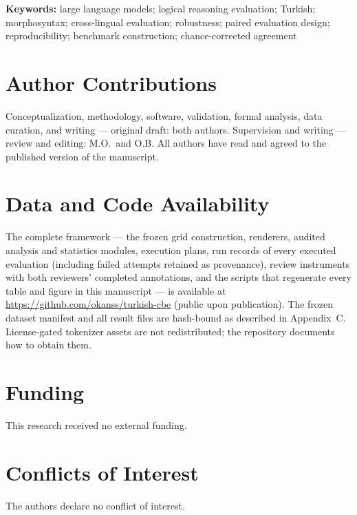 \documentclass[11pt]{article}
\begin{document}
\vspace{0.6ex}
\noindent\textbf{Keywords:} large language models; logical reasoning evaluation; Turkish;
morphosyntax; cross-lingual evaluation; robustness; paired evaluation design; reproducibility;
benchmark construction; chance-corrected agreement












\section*{Author Contributions}
Conceptualization, methodology, software, validation, formal analysis, data curation, and
writing --- original draft: both authors. Supervision and writing --- review and editing:
M.O.\ and O.B. All authors have read and agreed to the published version of the manuscript.

\section*{Data and Code Availability}
The complete framework --- the frozen grid construction, renderers, audited analysis and
statistics modules, execution plans, run records of every executed evaluation (including failed
attempts retained as provenance), review instruments with both reviewers' completed annotations,
and the scripts that regenerate every table and figure in this manuscript --- is available at
\url{https://github.com/okanss/turkish-cbe} (public upon publication).
The frozen dataset manifest and all result files are hash-bound as described in Appendix~C.
License-gated tokenizer assets are not redistributed; the repository documents how to obtain them.

\section*{Funding}
This research received no external funding.

\section*{Conflicts of Interest}
The authors declare no conflict of interest.




\appendix

\end{document}
